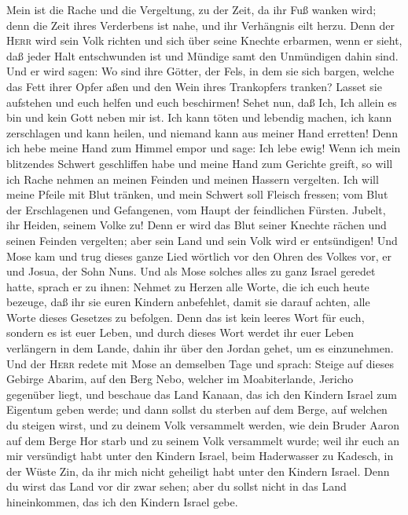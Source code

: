 Mein ist die Rache und die Vergeltung, zu der Zeit, da ihr Fuß wanken
wird; denn die Zeit ihres Verderbens ist nahe, und ihr Verhängnis eilt
herzu.  Denn der \textsc{Herr} wird sein Volk richten und
sich über seine Knechte erbarmen, wenn er sieht, daß jeder Halt
entschwunden ist und Mündige samt den Unmündigen dahin sind.
 Und er wird sagen: Wo sind ihre Götter, der Fels, in dem
sie sich bargen,  welche das Fett ihrer Opfer aßen und
den Wein ihres Trankopfers tranken? Lasset sie aufstehen und euch helfen
und euch beschirmen!  Sehet nun, daß Ich, Ich allein es
bin und kein Gott neben mir ist. Ich kann töten und lebendig machen, ich
kann zerschlagen und kann heilen, und niemand kann aus meiner Hand
erretten!  Denn ich hebe meine Hand zum Himmel empor und
sage: Ich lebe ewig!  Wenn ich mein blitzendes Schwert
geschliffen habe und meine Hand zum Gerichte greift, so will ich Rache
nehmen an meinen Feinden und meinen Hassern vergelten. 
Ich will meine Pfeile mit Blut tränken, und mein Schwert soll Fleisch
fressen; vom Blut der Erschlagenen und Gefangenen, vom Haupt der
feindlichen Fürsten.  Jubelt, ihr Heiden, seinem Volke
zu! Denn er wird das Blut seiner Knechte rächen und seinen Feinden
vergelten; aber sein Land und sein Volk wird er entsündigen!
 Und Mose kam und trug dieses ganze Lied wörtlich vor den
Ohren des Volkes vor, er und Josua, der Sohn Nuns.  Und
als Mose solches alles zu ganz Israel geredet hatte, sprach er zu ihnen:
 Nehmet zu Herzen alle Worte, die ich euch heute bezeuge,
daß ihr sie euren Kindern anbefehlet, damit sie darauf achten, alle
Worte dieses Gesetzes zu befolgen.  Denn das ist kein
leeres Wort für euch, sondern es ist euer Leben, und durch dieses Wort
werdet ihr euer Leben verlängern in dem Lande, dahin ihr über den Jordan
gehet, um es einzunehmen.  Und der \textsc{Herr} redete
mit Mose an demselben Tage und sprach:  Steige auf dieses
Gebirge Abarim, auf den Berg Nebo, welcher im Moabiterlande, Jericho
gegenüber liegt, und beschaue das Land Kanaan, das ich den Kindern
Israel zum Eigentum geben werde;  und dann sollst du
sterben auf dem Berge, auf welchen du steigen wirst, und zu deinem Volk
versammelt werden, wie dein Bruder Aaron auf dem Berge Hor starb und zu
seinem Volk versammelt wurde;  weil ihr euch an mir
versündigt habt unter den Kindern Israel, beim Haderwasser zu Kadesch,
in der Wüste Zin, da ihr mich nicht geheiligt habt unter den Kindern
Israel.  Denn du wirst das Land vor dir zwar sehen; aber
du sollst nicht in das Land hineinkommen, das ich den Kindern Israel
gebe.

